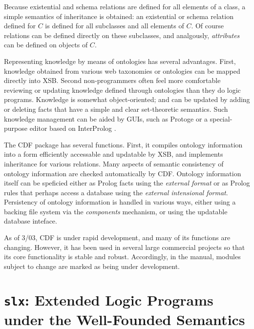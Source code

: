 {Because existential and schema relations are defined for all elements
of a class, a simple semantics of inheritance is obtained: an
existential or schema relation defined for $C$ is defined for all
subclasses and all elements of $C$.  Of course relations can be
defined directly on these subclasses, and analgously, {\em attributes}
can be defined on objects of $C$.

Representing knowledge by means of ontologies has several advantages.
First, knowledge obtained from various web taxonomies or ontologies
can be mapped directly into XSB.  Second non-programmers often feel
more comfortable reviewing or updating knowledge defined through
ontologies than they do logic programs.  Knowledge is somewhat
object-oriented; and can be updated by adding or deleting facts that
have a simple and clear set-theoretic semantics.  Such knowledge
management can be aided by GUIs, such as Protoge \cite{protege} or a
special-purpose editor based on InterProlog \cite{interprolog}.

The CDF package has several functions.  First, it compiles ontology
information into a form efficiently accessable and updatable by XSB,
and implements inheritance for various relations.  Many aspects of
semantic consistency of ontology information are checked automatically
by CDF.  Ontology information itself can be speficied either as Prolog
facts using the {\em external format} or as Prolog rules that perhaps
access a database using the {\em external intensional format}.
Persistency of ontology information is handled in various ways, either
using a backing file system via the {\em components} mechanism, or
using the updatable database inteface.

As of 3/03, CDF is under rapid development, and many of its functions
are changing.  However, it has been used in several large commercial
projects so that its core functionality is stable and robust.
Accordingly, in the manual, modules subject to change are marked as
being under development.
}

\section{{\tt slx}: Extended Logic Programs under the Well-Founded
Semantics}
\label{package:wfsx} 

